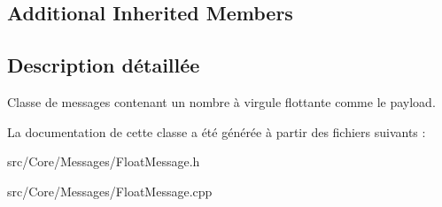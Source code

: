 \subsection*{Additional Inherited Members}


\subsection{Description détaillée}
Classe de messages contenant un nombre à virgule flottante comme le payload. 

La documentation de cette classe a été générée à partir des fichiers suivants \-:\begin{DoxyCompactItemize}
\item 
src/\-Core/\-Messages/Float\-Message.\-h\item 
src/\-Core/\-Messages/Float\-Message.\-cpp\end{DoxyCompactItemize}
